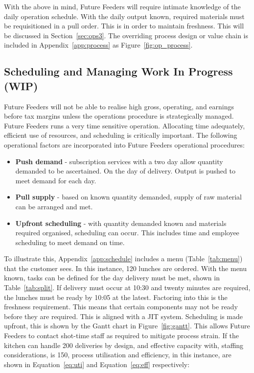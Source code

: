 With the above in mind, Future Feeders will require intimate knowledge of the daily operation schedule. With the daily output known, required materials must be requisitioned in a pull order. This is in order to maintain freshness. This will be discussed in Section~\ref{sec:ops3}. The overriding process design or value chain is included in Appendix~\ref{app:process} as Figure~\ref{fig:op_process}.

\subsection{Scheduling and Managing Work In Progress (WIP)}
Future Feeders will not be able to realise high gross, operating, and earnings before tax margins unless the operations procedure is strategically managed. Future Feeders runs a very time sensitive operation. Allocating time adequately, efficient use of resources, and scheduling is critically important. The following operational factors are incorporated into Future Feeders operational procedures:

\begin{itemize}
    \item \textbf{Push demand} - subscription services with a two day allow quantity demanded to be ascertained. On the day of delivery. Output is pushed to meet demand for each day.
    \item \textbf{Pull supply} - based on known quantity demanded, supply of raw material can be arranged and met.
    \item \textbf{Upfront scheduling} - with quantity demanded known and materials required organised, scheduling can occur. This includes time and employee scheduling to meet demand on time.
\end{itemize}

To illustrate this, Appendix~\ref{app:schedule} includes a menu (Table~\ref{tab:menu}) that the customer sees. In this instance, 120 lunches are ordered. With the menu known, tasks can be defined for the day delivery must be met, shown in Table~\ref{tab:split}. If delivery must occur at 10:30 and twenty minutes are required, the lunches must be ready by 10:05 at the latest. Factoring into this is the freshness requirement. This means that certain components may not be ready before they are required. This is aligned with a JIT system. Scheduling is made upfront, this is shown by the Gantt chart in Figure~\ref{fig:gantt}. This allows Future Feeders to contact shot-time staff as required to mitigate process strain. If the kitchen can handle 200 deliveries by design, and effective capacity with, staffing considerations, is 150, process utilisation and efficiency, in this instance, are shown in Equation~\ref{eq:uti} and Equation~\ref{eq:eff} respectively:


